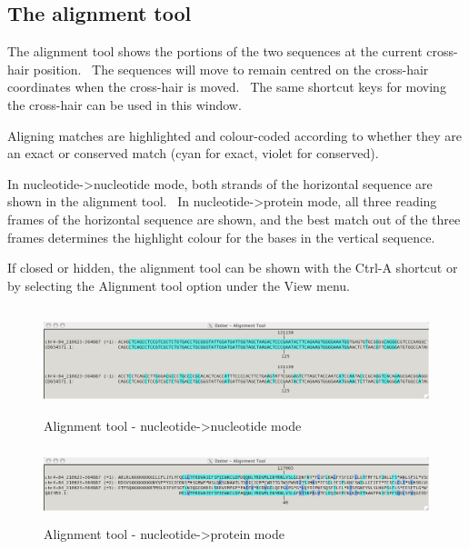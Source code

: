 \documentclass[letterpaper]{article}
\begin{document}
{\color[rgb]{0.30980393,0.5058824,0.7411765}\subsection[The alignment tool]{The alignment tool}}
{The alignment tool shows the portions of the two sequences at the
current cross-hair position. \ The sequences will move to remain
centred on the cross-hair coordinates when the cross-hair is moved.
\ The same shortcut keys for moving the cross-hair can be used in this
window.}

\bigskip

{Aligning matches are highlighted and colour-coded according to whether
they are an exact or conserved match (cyan for exact, violet for
conserved).}

\bigskip

{In nucleotide-{\textgreater}nucleotide mode, both strands of the
horizontal sequence are shown in the alignment tool. \ In
nucleotide-{\textgreater}protein mode, all three reading frames of the
horizontal sequence are shown, and the best match out of the three
frames determines the highlight colour for the bases in the vertical
sequence.}

\bigskip

{If closed or hidden, the alignment tool can be shown with the
{\textquotesingle}Ctrl-A{\textquotesingle} shortcut or by selecting the
{\textquotesingle}Alignment tool{\textquotesingle} option under the
{\textquotesingle}View{\textquotesingle} menu.}

\begin{figure}
 \centering
 \color[rgb]{0.30980393,0.5058824,0.7411765}
 \includegraphics[width=15.24cm,height=3.074cm]{img_window_nucleotide.png}
 \caption{Alignment tool - nucleotide-{\textgreater}nucleotide mode}
\end{figure}

\begin{figure}
 \centering
 \color[rgb]{0.30980393,0.5058824,0.7411765}
 \includegraphics[width=15.24cm,height=2.127cm]{img_window_protein.png}
 \caption{Alignment tool - nucleotide-{\textgreater}protein mode}
\end{figure}
\end{document}
